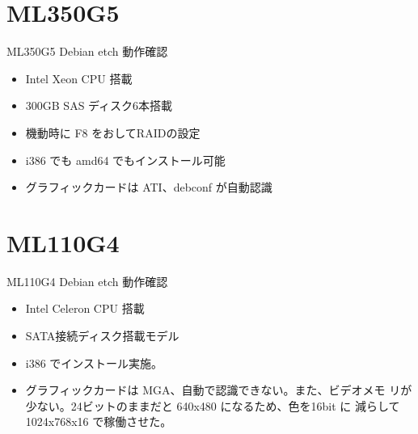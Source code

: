 \documentclass[cjk,dvipdfmx,12pt]{beamer}
\begin{document}
\section{ML350G5}
\begin{frame}{ML350G5 Debian etch 動作確認}

 \begin{minipage}[t]{0.45\hsize}
\begin{itemize}
 \item Intel Xeon CPU 搭載
 \item 300GB SAS ディスク6本搭載
\end{itemize}
 \end{minipage}
 \begin{minipage}[t]{0.45\hsize}
  \begin{itemize}
   \item 機動時に F8 をおしてRAIDの設定
   \item i386 でも amd64 でもインストール可能
   \item グラフィックカードは ATI、debconf が自動認識
  \end{itemize}
 \end{minipage}
\end{frame}

\section{ML110G4}
\begin{frame}{ML110G4 Debian etch 動作確認}

 \begin{minipage}[t]{0.45\hsize}
\begin{itemize}
 \item Intel Celeron CPU 搭載
 \item SATA接続ディスク搭載モデル
\end{itemize}
 \end{minipage}
 \begin{minipage}[t]{0.45\hsize}
  \begin{itemize}
   \item i386 でインストール実施。
   \item グラフィックカードは MGA、自動で認識できない。また、ビデオメモ
	 リが少ない。24ビットのままだと 640x480 になるため、色を16bit に
	 減らして 1024x768x16 で稼働させた。
  \end{itemize}
 \end{minipage}
\end{frame}
\end{document}
